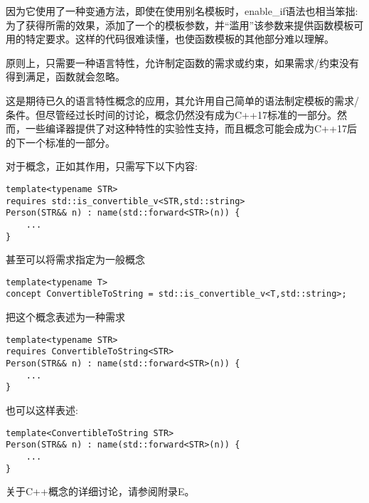 因为它使用了一种变通方法，即使在使用别名模板时，enable\_if语法也相当笨拙:为了获得所需的效果，添加了一个的模板参数，并“滥用”该参数来提供函数模板可用的特定要求。这样的代码很难读懂，也使函数模板的其他部分难以理解。

原则上，只需要一种语言特性，允许制定函数的需求或约束，如果需求/约束没有得到满足，函数就会忽略。

这是期待已久的语言特性概念的应用，其允许用自己简单的语法制定模板的需求/条件。但尽管经过长时间的讨论，概念仍然没有成为C++17标准的一部分。然而，一些编译器提供了对这种特性的实验性支持，而且概念可能会成为C++17后的下一个标准的一部分。

对于概念，正如其作用，只需写下以下内容:

\begin{lstlisting}[style=styleCXX]
template<typename STR>
requires std::is_convertible_v<STR,std::string>
Person(STR&& n) : name(std::forward<STR>(n)) {
	...
}
\end{lstlisting}

甚至可以将需求指定为一般概念

\begin{lstlisting}[style=styleCXX]
template<typename T>
concept ConvertibleToString = std::is_convertible_v<T,std::string>;
\end{lstlisting}

把这个概念表述为一种需求

\begin{lstlisting}[style=styleCXX]
template<typename STR>
requires ConvertibleToString<STR>
Person(STR&& n) : name(std::forward<STR>(n)) {
	...
}
\end{lstlisting}

也可以这样表述:

\begin{lstlisting}[style=styleCXX]
template<ConvertibleToString STR>
Person(STR&& n) : name(std::forward<STR>(n)) {
	...
}
\end{lstlisting}

关于C++概念的详细讨论，请参阅附录E。




















